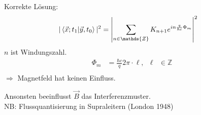 Korrekte Lösung:
	\begin{align*}
		|\braket{\vec{x}; t_1 | \vec{y} , t_0}|^2 &=
		\left|
			\sum_{n\in\mathds{Z}} K_{n+1} e^{in \frac{q}{\hbar c} \Phi_m}
		\right|^2
	\end{align*}
$n$ ist Windungszahl.
	\begin{align*}
		\Phi_m &= \frac{\hbar c}{q} 2\pi \cdot \ell ,& \ell&\in \mathds{Z} \\
	\end{align*}
$\Rightarrow$ Magnetfeld hat keinen Einfluss.

Ansonsten beeinflusst $\vec{B}$ das Interferenzmuster. 
\\
NB: Flussquantisierung in Supraleitern (London 1948)